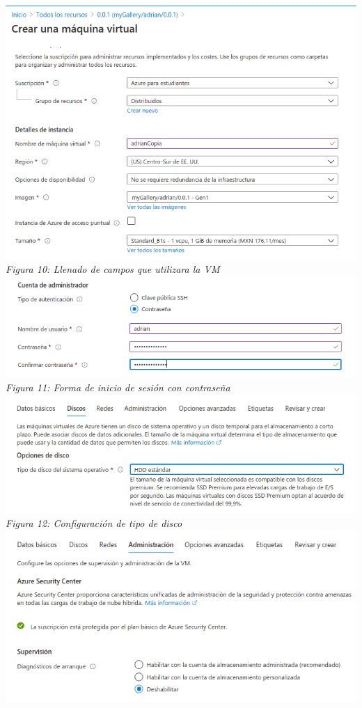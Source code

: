 \documentclass[10pt,executivepaper]{article}
\begin{document}
\begin{center}
  \includegraphics[scale=0.5]{imgs/10.png}\\
  \textit{Figura 10: Llenado de campos que utilizara la VM}\\
  \includegraphics[scale=0.5]{imgs/11.png}\\
  \textit{Figura 11: Forma de inicio de sesión con contraseña}\\
  \includegraphics[scale=0.5]{imgs/12.png}\\
  \textit{Figura 12: Configuración de tipo de disco}\\
  \includegraphics[scale=0.5]{imgs/13.png}\\

\end{center}
\end{document}
